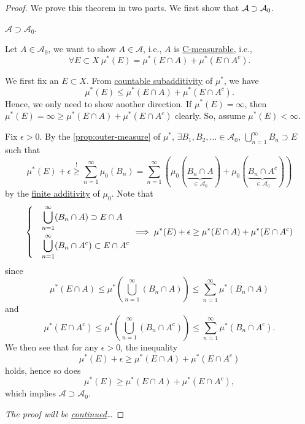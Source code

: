 \begin{proof}\let\qed\relax
	We prove this theorem in two parts. We first show that \(\mathcal{\MakeUppercase{a}} \supset \mathcal{\MakeUppercase{a}} _0\).
	\begin{claim}
		\(\mathcal{A} \supset \mathcal{A} _0\).
	\end{claim}
	\begin{explanation}
		Let \(A\in \mathcal{A} _0\), we want to show \(A\in \mathcal{A} \), i.e.,
		\(A\) is \hyperref[def:C-measurable]{C-measurable}, i.e.,
		\[
			\forall E\subset X\ \mu^{*} (E) = \mu^{*} (E\cap A) + \mu^{*} (E\cap A^{c}).
		\]

		\par We first fix an \(E\subset X\). From \hyperref[def:outer-measure-countable-subadditivity]{countable subadditivity} of \(\mu^{*} \), we have
		\[
			\mu^{*} (E) \leq \mu^{*} (E\cap A) + \mu^{*} (E\cap A^{c} ).
		\]
		Hence, we only need to show another direction. If \(\mu^{*} (E) = \infty \), then \(\mu^{*} (E) = \infty \geq \mu^{*} (E\cap A) + \mu^{*} (E\cap A^{c} )\) clearly.
		So, assume \(\mu^{*} (E)<\infty \).

		\par Fix \(\epsilon >0\). By the \autoref{prop:outer-measure} of \(\mu^{*} \), \(\exists B_1, B_2, \ldots \in \mathcal{A}_0\),
		\(\bigcup\limits_{n=1}^{\infty} B_{n}\supset E\) such that
		\[
			\mu^{*} (E) + \epsilon \overset{\hyperref[prop:outer-measure]{!}}{\geq} \sum\limits_{n=1}^{\infty} \mu_0(B_{n}) = \sum\limits_{n=1}^{\infty} \left(\mu_0(\underbrace{B_{n}\cap A}_{\in \mathcal{A} _0}) + \mu_0(\underbrace{B_{n}\cap A^{c}}_{\in \mathcal{A} _0} )\right)
		\]
		by the \hyperref[def:pre-measure-finite-additivity]{finite additivity} of \(\mu_0\). Note that
		\[
			\begin{dcases}
				 & \bigcup\limits_{n=1}^{\infty} (B_{n}\cap A)      \supset E\cap A     \\
				 & \bigcup\limits_{n=1}^{\infty} (B_{n}\cap A^{c})  \subset E\cap A^{c}
			\end{dcases}\implies \mu^{*} (E)+\epsilon \geq \mu^{*} (E\cap A) + \mu^{*} (E\cap A^{c} )
		\]
		since
		\[
			\mu^{*} (E\cap A)\leq \mu^{*} \left(\bigcup\limits_{n=1}^{\infty} (B_{n}\cap A)\right)\leq \sum\limits_{n=1}^{\infty} \mu^{*} (B_{n}\cap A)
		\]
		and
		\[
			\mu^{*} (E\cap A^{c} )\leq \mu^{*} \left(\bigcup\limits_{n=1}^{\infty} (B_{n}\cap A^{c})\right) \leq \sum\limits_{n=1}^{\infty} \mu^{*} (B_{n}\cap A^{c} ).
		\]
		We then see that for any \(\epsilon >0\), the inequality
		\[
			\mu^{*} (E)+\epsilon \geq \mu^{*} (E\cap A) + \mu^{*} (E\cap A^{c} )
		\]
		holds, hence so does
		\[
			\mu^{*} (E) \geq \mu^{*} (E\cap A) + \mu^{*} (E\cap A^{c} ),
		\]
		which implies \(\mathcal{A} \supset \mathcal{A} _0\).
	\end{explanation}
	\emph{The proof will be \hyperref[pf:Hahn-Kolmogorov-Thm-cont]{continued}\ldots}
\end{proof}